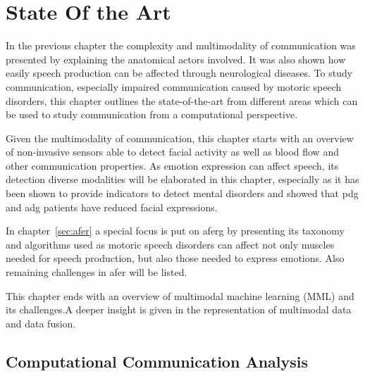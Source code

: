 \chapter{State Of the Art}
\label{cha:stateofart}

\acresetall

In the previous chapter the complexity and multimodality of communication was presented by explaining the anatomical actors involved. It was also shown how easily speech production can be affected through neurological diseases. To study communication, especially impaired communication caused by motoric speech disorders, this chapter outlines the state-of-the-art from different areas which can be used to study communication from a computational perspective. 

Given the multimodality of communication, this chapter starts with an overview of non-invasive sensors able to detect facial activity as well as blood flow and other communication properties. As emotion expression can affect speech, its detection diverse modalities will be elaborated in this chapter, especially as it has been shown to provide indicators to detect mental disorders and showed that \gls{pdg} and \gls{adg} patients have reduced facial expressions. 

In chapter~\ref{sec:afer} a special focus is put on \gls{aferg} by presenting its taxonomy and algorithms used as motoric speech disorders can affect not only muscles needed for speech production, but also those needed to express emotions. Also remaining challenges in \gls{afer} will be listed.

This chapter ends with an overview of multimodal machine learning (MML) and its challenges.A deeper insight is given in the representation of multimodal data and data fusion.


\section{Computational Communication Analysis }
\label{sec:compcommunication}

